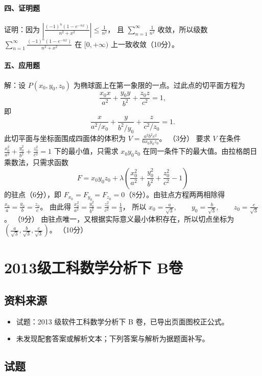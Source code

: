 \paragraph*{四、证明题}
证明：因为
\(\displaystyle \left|\frac{(-1)^n(1-e^{-nx})}{n^2+x^2}\right|\le \frac{1}{n^2}\)，
且 $\displaystyle\sum_{n=1}^{\infty}\frac1{n^2}$ 收敛，所以级数
\(\displaystyle \sum_{n=1}^{\infty}\frac{(-1)^n(1-e^{-nx})}{n^2+x^2}\)
在 $[0,+\infty)$ 上一致收敛（10分）。

\paragraph*{五、应用题}
解：设 $P(x_0,y_0,z_0)$ 为椭球面上在第一象限的一点。过此点的切平面方程为
\[
  \frac{x_0x}{a^2}+\frac{y_0y}{b^2}+\frac{z_0z}{c^2}=1,
\]
即
\[
  \frac{x}{a^2/x_0}+\frac{y}{b^2/y_0}+\frac{z}{c^2/z_0}=1.
\]
此切平面与坐标面围成四面体的体积为
\(\displaystyle V=\frac{a^2b^2c^2}{6x_0y_0z_0}\)。
（3分）
要求 $V$ 在条件
\(\displaystyle \frac{x_0^2}{a^2}+\frac{y_0^2}{b^2}+\frac{z_0^2}{c^2}=1\)
下的最小值，只需求 $x_0y_0z_0$ 在同一条件下的最大值。由拉格朗日乘数法，只需求函数
\[
  F=x_0y_0z_0+\lambda\left(\frac{x_0^2}{a^2}
  +\frac{y_0^2}{b^2}+\frac{z_0^2}{c^2}-1\right)
\]
的驻点（6分），即 $F_{x_0}=F_{y_0}=F_{z_0}=0$（8分）。由驻点方程两两相除得
\(\displaystyle \frac{x_0}{a}=\frac{y_0}{b}=\frac{z_0}{c}\)。
由此得
\(\displaystyle \frac{x_0^2}{a^2}=\frac{y_0^2}{b^2}=\frac{z_0^2}{c^2}=\frac13\)，
所以
\(\displaystyle x_0=\frac{a}{\sqrt3},\qquad
  y_0=\frac{b}{\sqrt3},\qquad
  z_0=\frac{c}{\sqrt3}\)。
（9分）
由驻点唯一，又根据实际意义最小体积存在，所以切点坐标为
\(\displaystyle \left(\frac{a}{\sqrt3},\frac{b}{\sqrt3},\frac{c}{\sqrt3}\right)\)。
（10分）

\section{2013级工科数学分析下 B卷}

\subsection{资料来源}
\begin{itemize}
  \item 试题：2013 级软件工科数学分析下 B 卷，已导出页面图校正公式。
  \item 未发现配套答案或解析文本；下列答案与解析为据题面补写。
\end{itemize}

\subsection{试题}

